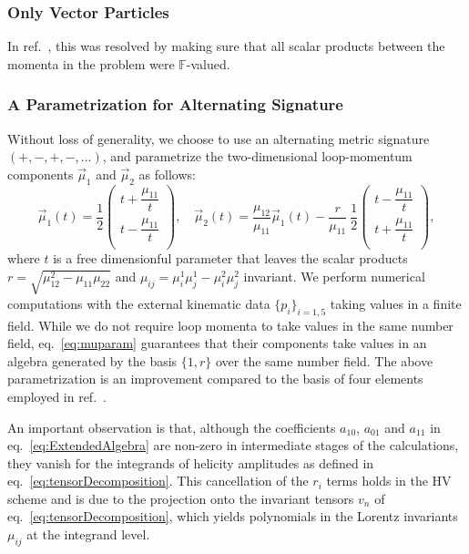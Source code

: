 \subsubsection{Only Vector Particles}
%
In ref.~\cite{Abreu:2017hqn}, this was resolved
by making sure that all scalar products
between the momenta in the problem were $\mathbb{F}$-valued.


\subsubsection{A Parametrization for Alternating Signature}

Without loss of generality, we choose
to use an alternating metric signature $(+,-,+,-,\ldots)$, and
parametrize the two-dimensional loop-momentum components 
$\vec{\mu}_1$ and $\vec{\mu}_2$ as follows:
\begin{equation}
  \vec{\mu}_1(t)  = \frac{1}{2}\begin{pmatrix}
    t+\dfrac{\mu_{11}}{t} \\
    t-\dfrac{\mu_{11}}{t} \\
  \end{pmatrix}, \quad
  \vec{\mu}_2(t)  = \frac{\mu_{12}}{\mu_{11}}\vec{\mu}_1(t) - \frac{r}{\mu_{11}}~\frac{1}{2}\begin{pmatrix}
    t-\dfrac{\mu_{11}}{t} \\
    t+\dfrac{\mu_{11}}{t} \\
  \end{pmatrix},
  \label{eq:muparam}
\end{equation}
where $t$ is a free dimensionful parameter that leaves the scalar products
$r = \sqrt{\mu_{12}^2-\mu_{11} \mu_{22}}$ and 
$\mu_{ij} = \mu_i^1 \mu_j^1 - \mu_i^2 \mu_j^2$ invariant. %
We perform numerical computations with the external kinematic data 
$\{ p_i\}_{i=1,5}$ taking values in a finite field. While we do not
require loop momenta to take values in the same number field,
eq.~\eqref{eq:muparam} guarantees that their components take values in an
algebra generated by the basis $\{1,r\}$ over the same number field.
The above parametrization is an improvement compared to the 
basis of four elements employed in ref.~\cite{Abreu:2018jgq}.

An important observation is that, although the coefficients 
$a_{10}$, $a_{01}$ and $a_{11}$ in 
eq.~\eqref{eq:ExtendedAlgebra} are non-zero in
intermediate stages of the calculations, they vanish
for the integrands of helicity amplitudes as defined in 
eq.~\eqref{eq:tensorDecomposition}. This cancellation of the
$r_i$ terms holds in the HV scheme and
is due to the projection onto the invariant tensors 
$v_n$ of eq.~\eqref{eq:tensorDecomposition}, 
which yields polynomials in the Lorentz invariants 
$\mu_{ij}$ at the integrand level.



